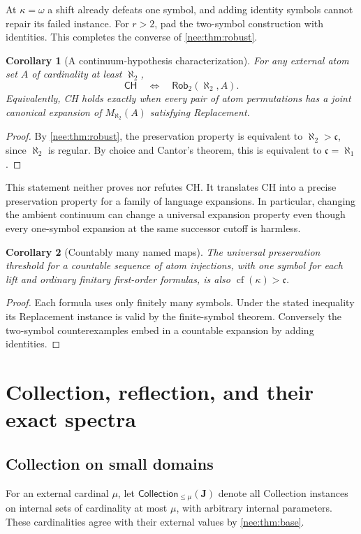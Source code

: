 \documentclass[11pt,letterpaper]{article}
\numberwithin{equation}{section}
\theoremstyle{plain}
\newtheorem{corollary}[corollary]{Corollary}
\theoremstyle{definition}
\theoremstyle{remark}
\newcommand{\Coll}{\mathsf{Collection}}
\newcommand{\cf}{\operatorname{cf}}
\newcommand{\cont}{\mathfrak c}
\begin{document}
At $\kappa=\omega$ a shift already defeats one symbol, and adding identity symbols cannot repair its failed instance. For $r>2$, pad the two-symbol construction with identities. This completes the converse of \cref{nee:thm:robust}.

\begin{corollary}[A continuum-hypothesis characterization]\label{nee:cor:CH}
For any external atom set $A$ of cardinality at least $\aleph_2$,
\[
\mathsf{CH}
\quad\Longleftrightarrow\quad
\mathsf{Rob}_2(\aleph_2,A).
\]
Equivalently, CH holds exactly when every pair of atom permutations has a joint canonical expansion of $M_{\aleph_2}(A)$ satisfying Replacement.
\end{corollary}
\begin{proof}
By \cref{nee:thm:robust}, the preservation property is equivalent to $\aleph_2>\cont$, since $\aleph_2$ is regular. By choice and Cantor's theorem, this is equivalent to $\cont=\aleph_1$.
\end{proof}

This statement neither proves nor refutes CH. It translates CH into a precise preservation property for a family of language expansions. In particular, changing the ambient continuum can change a universal expansion property even though every one-symbol expansion at the same successor cutoff is harmless.

\begin{corollary}[Countably many named maps]\label{nee:cor:countable}
The universal preservation threshold for a countable sequence of atom injections, with one symbol for each lift and ordinary finitary first-order formulas, is also $\cf(\kappa)>\cont$.
\end{corollary}
\begin{proof}
Each formula uses only finitely many symbols. Under the stated inequality its Replacement instance is valid by the finite-symbol theorem. Conversely the two-symbol counterexamples embed in a countable expansion by adding identities.
\end{proof}

\section{Collection, reflection, and their exact spectra}\label{nee:sec:collection}

\subsection{Collection on small domains}
For an external cardinal $\mu$, let $\Coll_{\leq\mu}(\boldsymbol J)$ denote all Collection instances on internal sets of cardinality at most $\mu$, with arbitrary internal parameters. These cardinalities agree with their external values by \cref{nee:thm:base}.
\end{document}

